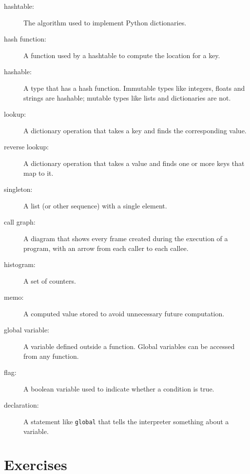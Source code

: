 \documentclass[10pt]{book}
\begin{document}
\begin{CJK}{UTF8}{gbsn}
\begin{description}
\item[hashtable:] The algorithm used to implement Python
dictionaries.

\item[hash function:] A function used by a hashtable to compute the
location for a key.

\item[hashable:] A type that has a hash function.  Immutable
types like integers,
floats and strings are hashable; mutable types like lists and
dictionaries are not.

\item[lookup:] A dictionary operation that takes a key and finds
the corresponding value.

\item[reverse lookup:] A dictionary operation that takes a value and finds
one or more keys that map to it.

\item[singleton:] A list (or other sequence) with a single element.

\item[call graph:] A diagram that shows every frame created during
the execution of a program, with an arrow from each caller to
each callee. 

\item[histogram:] A set of counters.

\item[memo:] A computed value stored to avoid unnecessary future 
computation.

\item[global variable:]  A variable defined outside a function.  Global
variables can be accessed from any function.

\item[flag:] A boolean variable used to indicate whether a condition
is true.

\item[declaration:] A statement like {\tt global} that tells the
interpreter something about a variable.

\end{description}

\section{Exercises}


\end{CJK}
\end{document}

